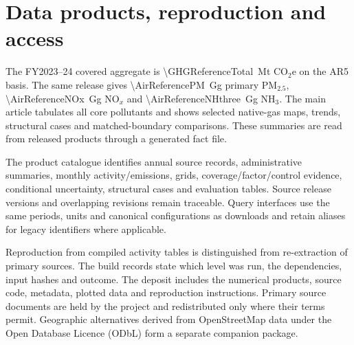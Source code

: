 \documentclass[essd]{copernicus}
\begin{document}
\section{Data products, reproduction and access}
The FY2023--24 covered aggregate is \SI{\GHGReferenceTotal}{\mega\tonne} CO$_2$e on the AR5 basis. The same release gives \SI{\AirReferencePM}{\giga\gram} primary PM$_{2.5}$, \SI{\AirReferenceNOx}{\giga\gram} NO$_x$ and \SI{\AirReferenceNHthree}{\giga\gram} NH$_3$. The main article tabulates all core pollutants and shows selected native-gas maps, trends, structural cases and matched-boundary comparisons. These summaries are read from released products through a generated fact file.

The product catalogue identifies annual source records, administrative summaries, monthly activity/emissions, grids, coverage/factor/control evidence, conditional uncertainty, structural cases and evaluation tables. Source release versions and overlapping revisions remain traceable. Query interfaces use the same periods, units and canonical configurations as downloads and retain aliases for legacy identifiers where applicable.

Reproduction from compiled activity tables is distinguished from re-extraction of primary sources. The build records state which level was run, the dependencies, input hashes and outcome. The deposit includes the numerical products, source code, metadata, plotted data and reproduction instructions. Primary source documents are held by the project and redistributed only where their terms permit. Geographic alternatives derived from OpenStreetMap data under the Open Database Licence (ODbL) form a separate companion package.
\end{document}
